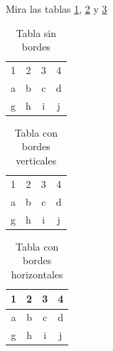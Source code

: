 Mira las tablas \ref{tab:miTablaSinBordes}, \ref{tab:miTablaBordesVerticales} y \ref{tab:miTablaBordesHorizontales}

\begin{table}[h]
    \centering
    \begin{tabular}{cccc}   %
        1 & 2 & 3 & 4 \\
        a & b & c & d\\
        g & h & i & j\\
    \end{tabular}
    \caption{Tabla sin bordes}
    \label{tab:miTablaSinBordes}
\end{table}

\begin{table}[h]
    \centering
    \begin{tabular}{|c|c|c|c|}  %
        1 & 2 & 3 & 4 \\
        a & b & c & d\\
        g & h & i & j\\
    \end{tabular}
    \caption{Tabla con bordes verticales}
    \label{tab:miTablaBordesVerticales}
\end{table}

\begin{table}[h]
    \centering
    \begin{tabular}{|c||c|c|c|}  %
        \hline
        1 & 2 & 3 & 4 \\
        \hline      %
        \hline
        a & b & c & d\\
        \hline
        g & h & i & j\\
        \hline
    \end{tabular}
    \caption{Tabla con bordes horizontales}
    \label{tab:miTablaBordesHorizontales}
\end{table}
